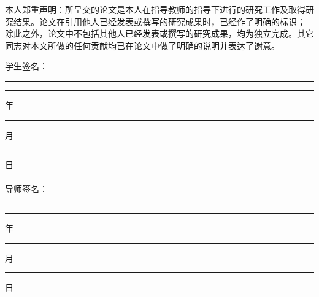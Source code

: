 ﻿\begin{announce}
本人郑重声明：所呈交的论文是本人在指导教师的指导下进行的研究工作及取得研究结果。论文在引用他人已经发表或撰写的研究成果时，已经作了明确的标识；%
除此之外，论文中不包括其他人已经发表或撰写的研究成果，均为独立完成。其它同志对本文所做的任何贡献均已在论文中做了明确的说明并表达了谢意。

\vspace{40ex}

\begin{flushright}
学生签名：\rule[-2pt]{2.5cm}{0.5pt}\qquad \rule[-2pt]{1.5cm}{0.5pt} 年\rule[-2pt]{1cm}{0.5pt} 月\rule[-2pt]{1cm}{0.5pt}日\\
~\\
导师签名：\rule[-2pt]{2.5cm}{0.5pt}\qquad  \rule[-2pt]{1.5cm}{0.5pt} 年\rule[-2pt]{1cm}{0.5pt} 月\rule[-2pt]{1cm}{0.5pt}日\\
\end{flushright}
\end{announce}
